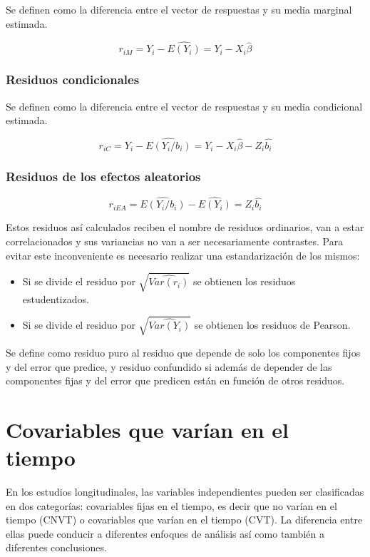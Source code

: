 \documentclass[12pt]{article}
\begin{document}
Se definen como la diferencia entre el vector de respuestas y su media marginal estimada.

\[ r_{iM} = Y_i - \widehat{E(Y_i)} = Y_i - X_i\hat{\beta} \]

\subsubsection{Residuos condicionales}

Se definen como la diferencia entre el vector de respuestas y su media condicional estimada.

\[ r_{iC} = Y_i - \widehat{E(Y_i/b_i)} = Y_i - X_i\hat{\beta} - Z_i\hat{b_i} \]

\subsubsection{Residuos de los efectos aleatorios}

\[ r_{iEA} = \widehat{E(Y_i/b_i)} - \widehat{E(Y_i)} = Z_i\hat{b_i} \]

Estos residuos así calculados reciben el nombre de residuos ordinarios, van a estar correlacionados y sus variancias no
van a ser necesariamente contrastes. Para evitar este inconveniente es necesario realizar una estandarización de los mismos:

\begin{itemize}
	\item Si se divide el residuo por $\sqrt{\widehat{Var(r_i)}}$ se obtienen los residuos estudentizados.
	\item Si se divide el residuo por $\sqrt{\widehat{Var(Y_i)}}$ se obtienen los residuos de Pearson.
\end{itemize}

Se define como residuo puro al residuo que depende de solo los componentes fijos y del error que predice, y residuo
confundido si además de depender de las componentes fijas y del error que predicen están en función de otros residuos.


\section{Covariables que varían en el tiempo}

En los estudios longitudinales, las variables independientes pueden ser clasificadas en dos categorías: covariables fijas
en el tiempo, es decir que no varían en el tiempo (CNVT) o covariables que varían en el tiempo (CVT). La diferencia entre
ellas puede conducir a diferentes enfoques de análisis así como también a diferentes conclusiones.
\end{document}
